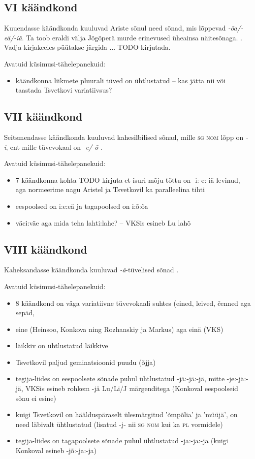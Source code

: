 \documentclass[12pt,a4paper]{article}
\newcommand{\vadja}[1]{\textit{#1}}
\newcommand{\msd}[1]{\textsc{#1}}
\begin{document}
\subsection{\RN{6} käändkond}

Kuuendasse käändkonda kuuluvad Ariste sõnul need sõnad, mis lõppevad \vadja{-õa/-eä/-iä}. Ta toob eraldi välja Jõgõperä murde erinevused üheainsa näitesõnaga. \cite[44]{ariste_grammar_1968}. Vadja kirjakeeles püütakse järgida ... TODO kirjutada.

Avatuid küsimusi-tähelepanekuid:
\begin{itemize}
\item käändkonna liikmete pluurali tüved on ühtlustatud -- kas jätta nii või taastada Tsvetkovi variatiivsus?
\end{itemize}


\subsection{\RN{7} käändkond}

Seitsmendasse käändkonda kuuluvad kahesilbilised sõnad, mille \msd{sg nom} lõpp on \vadja{-i}, ent mille tüvevokaal on \vadja{-e/-õ} \cite[45]{ariste_grammar_1968}.

Avatuid küsimusi-tähelepanekuid:
\begin{itemize}
\item 7 käändkonna kohta TODO kirjuta et isuri mõju tõttu on -i:-e:-iä levinud, aga normeerime nagu Aristel ja Tsvetkovil ka paralleelina tihti
\item eespoolsed on i:e:eä ja tagapoolsed on i:õ:õa
\item väci:väe aga mida teha lahti:lahe? -- VKSis esineb Lu lahõ
\end{itemize}


\subsection{\RN{8} käändkond}

Kaheksandasse käändkonda kuuluvad \vadja{-ä}-tüvelised sõnad \cite[46]{ariste_grammar_1968}.

Avatuid küsimusi-tähelepanekuid:
\begin{itemize}
\item 8 käändkond on väga variatiivne tüvevokaali suhtes (eined, leived, čenned aga sepäd,
\item eine (Heinsoo, Konkova ning Rozhanskiy ja Markus) aga einä (VKS)
\item läikkiv on ühtlustatud läikkive
\item Tsvetkovil paljud geminatsioonid puudu (õjja)
\item tegija-liides on eespoolsete sõnade puhul ühtlustatud -jä:-jä:-jä, mitte -je:-jä:-jä, VKSis esineb rohkem -jä Lu/Li/J märgenditega (Konkoval eespoolseid sõnu ei esine)
\item kuigi Tsvetkovil on häälduspäraselt ülesmärgitud 'õmpõlia' ja 'müüjä', on need läbivalt ühtlustatud (lisatud -j- nii \msd{sg nom} kui ka \msd{pl} vormidele)
\item tegija-liides on tagapoolsete sõnade puhul ühtlustatud -ja:-ja:-ja (kuigi Konkoval esineb -jõ:-ja:-ja)
\end{itemize}
\end{document}
